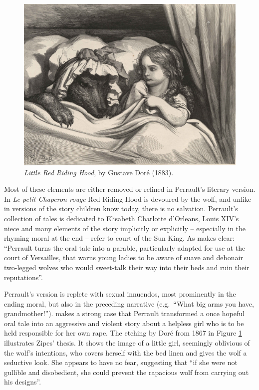 \begin{figure}[t]
    \centering
    \includegraphics[width=\textwidth]{images/dore}
    \caption{\emph{Little Red Riding Hood}, by Gustave Doré (1883).}
    \label{fig:dore}
\end{figure}

Most of these elements are either removed or refined in Perrault's literary version. In \emph{Le petit Chaperon rouge} Red Riding Hood is devoured by the wolf, and unlike in versions of the story children know today, there is no salvation. Perrault's collection of tales is dedicated to Elisabeth Charlotte d'Orleans, Louis XIV's niece and many elements of the story implicitly or explicitly -- especially in the rhyming moral at the end -- refer to court of the Sun King. As \citeauthor{beckett:2008} makes clear: ``Perrault turns the oral tale into a parable, particularly adapted for use at the court of Versailles, that warns young ladies to be aware of suave and debonair two-legged wolves who would sweet-talk their way into their beds and ruin their reputations''\autocite[13]{beckett:2008}.

Perrault's version is replete with sexual innuendos, most prominently in the ending moral, but also in the preceding narrative (e.g.\ ``What big arms you have, grandmother!''). \citeauthor{zipes:1993} makes a strong case that Perrault transformed a once hopeful oral tale into an aggressive and violent story about a helpless girl who is to be held responsible for her own rape\autocite{zipes:1993}. The etching by Doré from 1867 in Figure \ref{fig:dore} illustrates Zipes' thesis. It shows the image of a little girl, seemingly oblivious of the wolf's intentions, who covers herself with the bed linen and gives the wolf a seductive look. She appears to have no fear, suggesting that ``if she were not gullible and disobedient, she could prevent the rapacious wolf from carrying out his designs''\autocite[39]{zipes:1993}.

